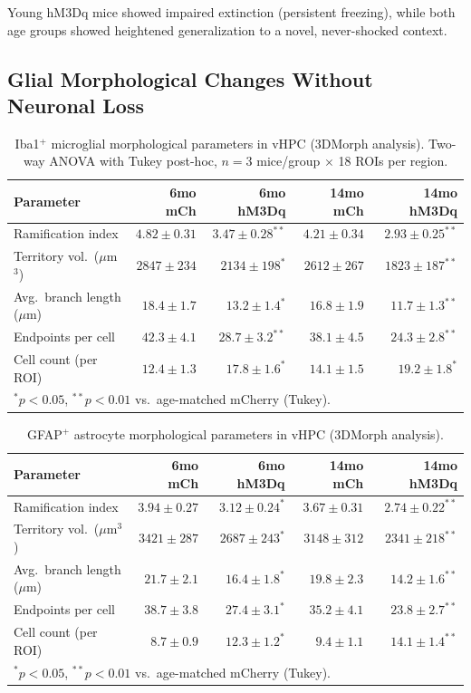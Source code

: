 \documentclass[11pt]{article}
\begin{document}
Young hM3Dq mice showed impaired extinction (persistent freezing), while both age groups showed heightened generalization to a novel, never-shocked context.

\subsection{Glial Morphological Changes Without Neuronal Loss}

\begin{table}[H]
\centering
\caption{Iba1$^+$ microglial morphological parameters in vHPC (3DMorph analysis). Two-way ANOVA with Tukey post-hoc, $n = 3$ mice/group $\times$ 18 ROIs per region.}
\label{tab:microglia}
\begin{tabular}{lrrrr}
\toprule
\textbf{Parameter} & \textbf{6mo mCh} & \textbf{6mo hM3Dq} & \textbf{14mo mCh} & \textbf{14mo hM3Dq} \\
\midrule
Ramification index & $4.82 \pm 0.31$ & $3.47 \pm 0.28^{**}$ & $4.21 \pm 0.34$ & $2.93 \pm 0.25^{**}$ \\
Territory vol.\ ($\mu$m$^3$) & $2847 \pm 234$ & $2134 \pm 198^{*}$ & $2612 \pm 267$ & $1823 \pm 187^{**}$ \\
Avg.\ branch length ($\mu$m) & $18.4 \pm 1.7$ & $13.2 \pm 1.4^{*}$ & $16.8 \pm 1.9$ & $11.7 \pm 1.3^{**}$ \\
Endpoints per cell & $42.3 \pm 4.1$ & $28.7 \pm 3.2^{**}$ & $38.1 \pm 4.5$ & $24.3 \pm 2.8^{**}$ \\
Cell count (per ROI) & $12.4 \pm 1.3$ & $17.8 \pm 1.6^{*}$ & $14.1 \pm 1.5$ & $19.2 \pm 1.8^{*}$ \\
\bottomrule
\multicolumn{5}{l}{\footnotesize $^{*}p < 0.05$, $^{**}p < 0.01$ vs.\ age-matched mCherry (Tukey).}
\end{tabular}
\end{table}

\begin{table}[H]
\centering
\caption{GFAP$^+$ astrocyte morphological parameters in vHPC (3DMorph analysis).}
\label{tab:astrocytes}
\begin{tabular}{lrrrr}
\toprule
\textbf{Parameter} & \textbf{6mo mCh} & \textbf{6mo hM3Dq} & \textbf{14mo mCh} & \textbf{14mo hM3Dq} \\
\midrule
Ramification index & $3.94 \pm 0.27$ & $3.12 \pm 0.24^{*}$ & $3.67 \pm 0.31$ & $2.74 \pm 0.22^{**}$ \\
Territory vol.\ ($\mu$m$^3$) & $3421 \pm 287$ & $2687 \pm 243^{*}$ & $3148 \pm 312$ & $2341 \pm 218^{**}$ \\
Avg.\ branch length ($\mu$m) & $21.7 \pm 2.1$ & $16.4 \pm 1.8^{*}$ & $19.8 \pm 2.3$ & $14.2 \pm 1.6^{**}$ \\
Endpoints per cell & $38.7 \pm 3.8$ & $27.4 \pm 3.1^{*}$ & $35.2 \pm 4.1$ & $23.8 \pm 2.7^{**}$ \\
Cell count (per ROI) & $8.7 \pm 0.9$ & $12.3 \pm 1.2^{*}$ & $9.4 \pm 1.1$ & $14.1 \pm 1.4^{**}$ \\
\bottomrule
\multicolumn{5}{l}{\footnotesize $^{*}p < 0.05$, $^{**}p < 0.01$ vs.\ age-matched mCherry (Tukey).}
\end{tabular}
\end{table}
\end{document}
